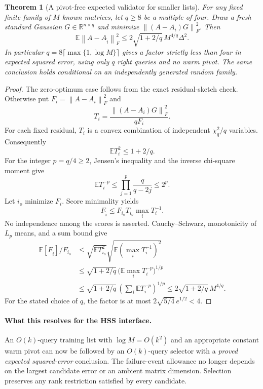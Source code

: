 \documentclass[11pt,oneside,openany,a4paper]{book}
\numberwithin{equation}{chapter}
\newtheorem{theorem}{Theorem}[chapter]
\theoremstyle{definition}
\theoremstyle{remark}
\newcommand{\R}{\mathbb R}\newcommand{\E}{\mathbb E}\newcommand{\Prb}{\mathbb P}\newcommand{\PP}{\mathbb P}
\newcommand{\F}[1]{\left\lVert#1\right\rVert_F}
\begin{document}
\begin{theorem}[A pivot-free expected validator for smaller lists]
\label{expected:thm:ordinary}
For any fixed finite family of $M$ known matrices, let $q\ge8$ be a
multiple of four. Draw a fresh standard Gaussian $G\in\R^{n\times q}$
and minimize $\F{(A-A_i)G}^2$. Then
\begin{equation}\label{expected:eq:ordinary}
 \E\F{A-A_{\widehat i}}^2
 \le2\sqrt{1+2/q}\,M^{4/q}\Delta^2.
\end{equation}
In particular $q=8\lceil\max\{1,\log M\}\rceil$ gives a factor
strictly less than four in expected squared error, using only $q$
right queries and no warm pivot. The same conclusion holds
conditional on an independently generated random family.
\end{theorem}
\begin{proof}
The zero-optimum case follows from the exact residual-sketch check.
Otherwise put $F_i=\F{A-A_i}^2$ and
\[
 T_i=\frac{\F{(A-A_i)G}^2}{qF_i}.
\]
For each fixed residual, $T_i$ is a convex combination of independent
$\chi_q^2/q$ variables. Consequently
\[
 \E T_i^2\le1+2/q.
\]
For the integer $p=q/4\ge2$, Jensen's inequality and the inverse
chi-square moment give
\[
 \E T_i^{-p}
 \le\prod_{j=1}^{p}\frac{q}{q-2j}\le2^p.
\]
Let $i_o$ minimize $F_i$. Score minimality yields
\[
 F_{\widehat i}\le F_{i_o} T_{i_o}\max_iT_i^{-1}.
\]
No independence among the scores is asserted. Cauchy--Schwarz,
monotonicity of $L_p$ means, and a sum bound give
\begin{align*}
 \E[F_{\widehat i}]/F_{i_o}
 &\le\sqrt{\E T_{i_o}^2}
              \sqrt{\E(\max_iT_i^{-1})^2}\\
 &\le\sqrt{1+2/q}\,
                \bigl(\E\max_i T_i^{-p}\bigr)^{1/p}\\
 &\le\sqrt{1+2/q}\,
                \left(\sum_i\E T_i^{-p}\right)^{1/p}
 \le2\sqrt{1+2/q}\,M^{4/q}.
\end{align*}
For the stated choice of $q$, the factor is at most
$2\sqrt{5/4}\,e^{1/2}<4$.
\end{proof}

\paragraph{What this resolves for the HSS interface.}
An $O(k)$-query training list with $\log M=O(k^2)$ and an appropriate
constant warm pivot can now be followed by an $O(k)$-query selector
with a \emph{proved expected squared-error} conclusion. The
failure-event allowance no longer depends on the largest candidate
error or an ambient matrix dimension. Selection preserves any rank
restriction satisfied by every candidate.
\end{document}

